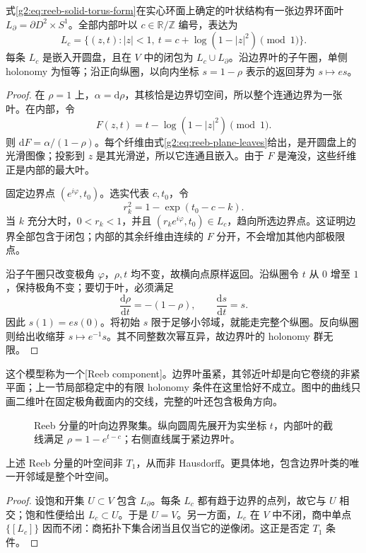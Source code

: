 \begin{proposition}\label{g2:prop:reeb-component-leaves}
	式\eqref{g2:eq:reeb-solid-torus-form}在实心环面上确定的叶状结构有一张边界环面叶 \(L_\partial=\partial D^2\times S^1\)。全部内部叶以 \(c\in\mathbb R/\mathbb Z\) 编号，表达为
	\begin{equation}\label{g2:eq:reeb-plane-leaves}
		L_c=\{(z,t):|z|<1,\ t=c+\log(1-|z|^2)\pmod1\}.
	\end{equation}
	每条 \(L_c\) 是嵌入开圆盘，且在 \(V\) 中的闭包为 \(L_c\cup L_\partial\)。沿边界叶的子午圈，单侧 holonomy 为恒等；沿正向纵圈，以向内坐标 \(s=1-\rho\) 表示的返回芽为 \(s\mapsto e s\)。
\end{proposition}
\begin{proof}
	在 \(\rho=1\) 上，\(\alpha=\mathrm d\rho\)，其核恰是边界切空间，所以整个连通边界为一张叶。在内部，令
	\[
		F(z,t)=t-\log(1-|z|^2)\pmod1.
	\]
	则 \(\mathrm dF=\alpha/(1-\rho)\)。每个纤维由式\eqref{g2:eq:reeb-plane-leaves}给出，是开圆盘上的光滑图像；投影到 \(z\) 是其光滑逆，所以它连通且嵌入。由于 \(F\) 是淹没，这些纤维正是内部的最大叶。

	固定边界点 \((e^{i\varphi},t_0)\)。选实代表 \(c,t_0\)，令
	\[
		r_k^2=1-\exp(t_0-c-k).
	\]
	当 \(k\) 充分大时，\(0<r_k<1\)，并且 \((r_ke^{i\varphi},t_0)\in L_c\)，趋向所选边界点。这证明边界全部包含于闭包；内部的其余纤维由连续的 \(F\) 分开，不会增加其他内部极限点。

	沿子午圈只改变极角 \(\varphi\)，\(\rho,t\) 均不变，故横向点原样返回。沿纵圈令 \(t\) 从 \(0\) 增至 \(1\)，保持极角不变；要切于叶，必须满足
	\[
		\frac{\mathrm d\rho}{\mathrm dt}=-(1-\rho),\qquad
		\frac{\mathrm ds}{\mathrm dt}=s.
	\]
	因此 \(s(1)=e s(0)\)。将初始 \(s\) 限于足够小邻域，就能走完整个纵圈。反向纵圈则给出收缩芽 \(s\mapsto e^{-1}s\)。其不同整数次幂互异，故边界叶的 holonomy 群无限。
\end{proof}

这个模型称为一个[Reeb component]。边界叶虽紧，其邻近叶却是向它卷绕的非紧平面；上一节局部稳定中的有限 holonomy 条件在这里恰好不成立。图中的曲线只画二维叶在固定极角截面内的交线，完整的叶还包含极角方向。

\begin{figure}[htbp]
	\centering
	
	\caption[Reeb 分量的叶向边界聚集]{Reeb 分量的叶向边界聚集。纵向圆周先展开为实坐标 \(t\)，内部叶的截线满足 \(\rho=1-e^{t-c}\)；右侧直线属于紧边界叶。}
	\label{g2:fig:reeb-component}
\end{figure}

\begin{proposition}\label{g2:prop:reeb-leaf-space}
	上述 Reeb 分量的叶空间非 \(T_1\)，从而非 Hausdorff。更具体地，包含边界叶类的唯一开邻域是整个叶空间。
\end{proposition}
\begin{proof}
	设饱和开集 \(U\subset V\) 包含 \(L_\partial\)。每条 \(L_c\) 都有趋于边界的点列，故它与 \(U\) 相交；饱和性便给出 \(L_c\subset U\)。于是 \(U=V\)。另一方面，\(L_c\) 在 \(V\) 中不闭，商中单点 \(\{[L_c]\}\) 因而不闭：商拓扑下集合闭当且仅当它的逆像闭。这正是否定 \(T_1\) 条件。
\end{proof}

